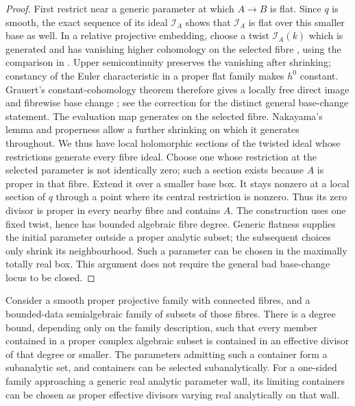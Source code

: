 \begin{proof}
First restrict near a generic parameter at which $A\to B$ is flat.
Since $q$ is smooth, the exact sequence of its ideal $\mathcal I_A$
shows that $\mathcal I_A$ is flat over this smaller base as well.
In a relative projective embedding, choose a twist
$\mathcal I_A(k)$ which is generated and has vanishing higher
cohomology on the selected fibre
\cite[Tag~0B5T]{StacksProject}, using the comparison in
\cite[Theorems~1--3]{Serre1956}. Upper semicontinuity preserves
the vanishing after shrinking; constancy of the Euler characteristic
in a proper flat family makes $h^0$ constant. Grauert's
constant-cohomology theorem therefore gives a locally free direct
image and fibrewise base change
\cite[\S7, S\"atze~3, 5 and~6]{Grauert1960}; see the correction
\cite[p.~36]{Grauert1963} for the distinct general base-change statement.
The evaluation map generates on the selected fibre. Nakayama's
lemma and properness allow a further shrinking on which it generates
throughout. We thus have local holomorphic sections of the twisted
ideal whose restrictions generate every fibre ideal. Choose one whose
restriction at the selected parameter is not identically zero;
such a section exists because $A$ is proper in that fibre.
Extend it over a smaller base box. It stays nonzero at a local
section of $q$ through a point where its central restriction is
nonzero. Thus its zero divisor is proper in every nearby fibre
and contains $A$. The construction uses one fixed twist, hence
has bounded algebraic fibre degree. Generic flatness supplies the
initial parameter outside a proper analytic subset; the subsequent
choices only shrink its neighbourhood. Such a parameter can be
chosen in the maximally totally real box. This argument does not
require the general bad base-change locus to be closed.
\end{proof}

\begin{lemma}\label{holes:bounded-containers}
Consider a smooth proper projective family with connected fibres, and
a bounded-data semialgebraic family of subsets of those fibres.
There is a degree bound, depending only on the
family description, such that every member contained in a proper
complex algebraic subset is contained in an effective divisor of
that degree or smaller. The parameters admitting such a container
form a subanalytic set, and containers can be selected subanalytically.
For a one-sided family approaching a generic real analytic parameter
wall, its limiting containers can be chosen as proper effective
divisors varying real analytically on that wall.
\end{lemma}

